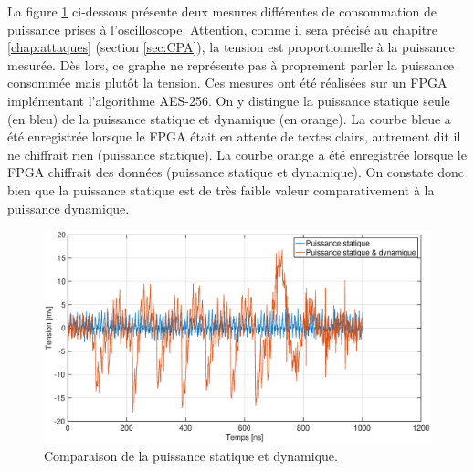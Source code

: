 \documentclass[oneside]{book}
\begin{document}
La figure \ref{fig:static_dynamic} ci-dessous présente deux mesures différentes de consommation de puissance prises à l'oscilloscope. Attention, comme il sera précisé au chapitre \ref{chap:attaques} (section \ref{sec:CPA}), la tension est proportionnelle à la puissance mesurée. Dès lors, ce graphe ne représente pas à proprement parler la puissance consommée mais plutôt la tension. Ces mesures ont été réalisées sur un FPGA implémentant l'algorithme AES-256. On y distingue la puissance statique seule (en bleu) de la puissance statique et dynamique (en orange). La courbe bleue a été enregistrée lorsque le FPGA était en attente de textes clairs, autrement dit il ne chiffrait rien (\Rightarrow puissance statique). La courbe orange a été enregistrée lorsque le FPGA chiffrait des données (\Rightarrow puissance statique et dynamique). On constate donc bien que la puissance statique est de très faible valeur comparativement à la puissance dynamique.
\begin{figure}[htbp]
    \hspace{-1cm}
    \includegraphics[scale=0.34]{image/static_dynamic}
    \caption{Comparaison de la puissance statique et dynamique.}
    \label{fig:static_dynamic}
\end{figure}



\vspace{-0.3cm}
\end{document}
